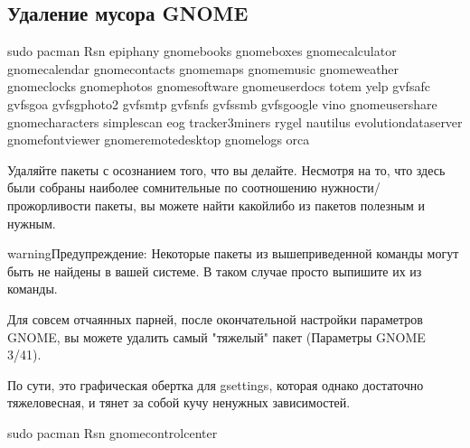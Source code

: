 \documentclass[letterpaper,10pt,russian,openany]{sphinxmanual}
\begin{document}
\subsection{Удаление мусора GNOME}
\label{\detokenize{source/de-optimizations:gnome}}\label{\detokenize{source/de-optimizations:gnome-garbage-removal}}\label{\detokenize{source/de-optimizations:index-2}}
\begin{sphinxVerbatim}[commandchars=\\\{\}]
sudo pacman \PYGZhy{}Rsn epiphany gnome\PYGZhy{}books gnome\PYGZhy{}boxes gnome\PYGZhy{}calculator gnome\PYGZhy{}calendar gnome\PYGZhy{}contacts gnome\PYGZhy{}maps gnome\PYGZhy{}music gnome\PYGZhy{}weather gnome\PYGZhy{}clocks gnome\PYGZhy{}photos gnome\PYGZhy{}software gnome\PYGZhy{}user\PYGZhy{}docs totem yelp gvfs\PYGZhy{}afc gvfs\PYGZhy{}goa gvfs\PYGZhy{}gphoto2 gvfs\PYGZhy{}mtp gvfs\PYGZhy{}nfs gvfs\PYGZhy{}smb gvfs\PYGZhy{}google vino gnome\PYGZhy{}user\PYGZhy{}share gnome\PYGZhy{}characters simple\PYGZhy{}scan eog tracker3\PYGZhy{}miners rygel nautilus evolution\PYGZhy{}data\PYGZhy{}server gnome\PYGZhy{}font\PYGZhy{}viewer gnome\PYGZhy{}remote\PYGZhy{}desktop gnome\PYGZhy{}logs orca
\end{sphinxVerbatim}

\sphinxAtStartPar
{} Удаляйте пакеты с осознанием того, что вы делайте.
Несмотря на то, что здесь были собраны наиболее сомнительные по соотношению нужности/прожорливости пакеты,
вы можете найти какой\sphinxhyphen{}либо из пакетов полезным и нужным.

\begin{sphinxadmonition}{warning}{Предупреждение:}
\sphinxAtStartPar
Некоторые пакеты из вышеприведенной команды могут быть не найдены в вашей системе.
В таком случае просто выпишите их из команды.
\end{sphinxadmonition}

\sphinxAtStartPar
Для совсем отчаянных парней, после окончательной настройки параметров GNOME,
вы можете удалить самый "тяжелый" пакет  (Параметры GNOME 3/41).

\sphinxAtStartPar
По сути, это графическая обертка для gsettings, которая однако достаточно тяжеловесная, и тянет за собой кучу ненужных зависимостей.

\begin{sphinxVerbatim}[commandchars=\\\{\}]
sudo pacman \PYGZhy{}Rsn gnome\PYGZhy{}control\PYGZhy{}center
\end{sphinxVerbatim}
\end{document}
